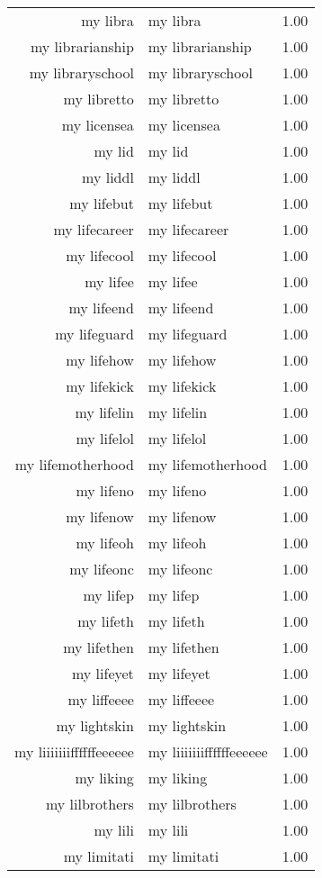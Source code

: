 \begin{table}[ht]
\begin{tabular}{rlr}
  my libra & my libra & 1.00 \\ 
  my librarianship & my librarianship & 1.00 \\ 
  my libraryschool & my libraryschool & 1.00 \\ 
  my libretto & my libretto & 1.00 \\ 
  my licensea & my licensea & 1.00 \\ 
  my lid & my lid & 1.00 \\ 
  my liddl & my liddl & 1.00 \\ 
  my lifebut & my lifebut & 1.00 \\ 
  my lifecareer & my lifecareer & 1.00 \\ 
  my lifecool & my lifecool & 1.00 \\ 
  my lifee & my lifee & 1.00 \\ 
  my lifeend & my lifeend & 1.00 \\ 
  my lifeguard & my lifeguard & 1.00 \\ 
  my lifehow & my lifehow & 1.00 \\ 
  my lifekick & my lifekick & 1.00 \\ 
  my lifelin & my lifelin & 1.00 \\ 
  my lifelol & my lifelol & 1.00 \\ 
  my lifemotherhood & my lifemotherhood & 1.00 \\ 
  my lifeno & my lifeno & 1.00 \\ 
  my lifenow & my lifenow & 1.00 \\ 
  my lifeoh & my lifeoh & 1.00 \\ 
  my lifeonc & my lifeonc & 1.00 \\ 
  my lifep & my lifep & 1.00 \\ 
  my lifeth & my lifeth & 1.00 \\ 
  my lifethen & my lifethen & 1.00 \\ 
  my lifeyet & my lifeyet & 1.00 \\ 
  my liffeeee & my liffeeee & 1.00 \\ 
  my lightskin & my lightskin & 1.00 \\ 
  my liiiiiiiffffffeeeeee & my liiiiiiiffffffeeeeee & 1.00 \\ 
  my liking & my liking & 1.00 \\ 
  my lilbrothers & my lilbrothers & 1.00 \\ 
  my lili & my lili & 1.00 \\ 
  my limitati & my limitati & 1.00 \\ 

\end{tabular}
\end{table}
